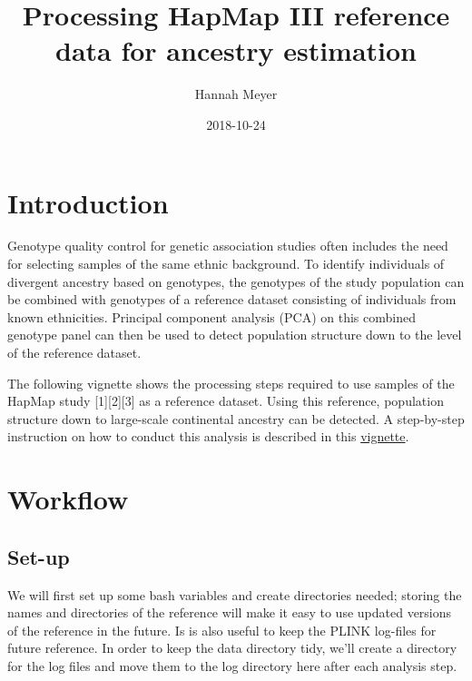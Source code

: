 \documentclass[]{article}
\title{Processing HapMap III reference data for ancestry estimation}
\author{Hannah Meyer}
\date{2018-10-24}
\newenvironment{Shaded}{}{}
\newcommand{\StringTok}[1]{\textcolor[rgb]{0.25,0.44,0.63}{#1}}
\newcommand{\FunctionTok}[1]{\textcolor[rgb]{0.02,0.16,0.49}{#1}}
\newcommand{\VariableTok}[1]{\textcolor[rgb]{0.10,0.09,0.49}{#1}}
\newcommand{\NormalTok}[1]{#1}
\begin{document}
\maketitle

{
\setcounter{tocdepth}{2}
\tableofcontents
}
\section{Introduction}\label{introduction}

Genotype quality control for genetic association studies often includes
the need for selecting samples of the same ethnic background. To
identify individuals of divergent ancestry based on genotypes, the
genotypes of the study population can be combined with genotypes of a
reference dataset consisting of individuals from known ethnicities.
Principal component analysis (PCA) on this combined genotype panel can
then be used to detect population structure down to the level of the
reference dataset.

The following vignette shows the processing steps required to use
samples of the HapMap study {[}1{]}{[}2{]}{[}3{]} as a reference
dataset. Using this reference, population structure down to large-scale
continental ancestry can be detected. A step-by-step instruction on how
to conduct this analysis is described in this
\href{https://hannahvmeyer.github.io/plinkQC/articles/AncestryCheck.html}{vignette}.

\section{Workflow}\label{workflow}

\subsection{Set-up}\label{set-up}

We will first set up some bash variables and create directories needed;
storing the names and directories of the reference will make it easy to
use updated versions of the reference in the future. Is is also useful
to keep the PLINK log-files for future reference. In order to keep the
data directory tidy, we'll create a directory for the log files and move
them to the log directory here after each analysis step.

\begin{Shaded}
\end{Shaded}
\end{document}
